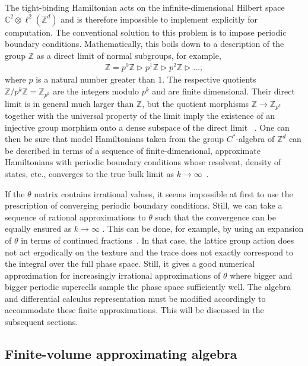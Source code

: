 \documentclass[submission, Phys]{SciPost}
\begin{document}
The tight-binding Hamiltonian acts on the infinite-dimensional Hilbert space $\mathbb{C}^2\otimes \ell^2(\mathbb{Z}^d)$ and is therefore impossible to implement explicitly for computation. 
The conventional solution to this problem is to impose periodic boundary conditions.
Mathematically, this boils down to a description of the group $\mathbb{Z}$ as a direct limit of normal subgroups, for example,
\begin{align}
    \mathbb{Z} = p^0 \mathbb{Z} \triangleright p^1 \mathbb{Z} \triangleright p^2 \mathbb{Z} \triangleright  \ldots,
\end{align}
where $p$ is a natural number greater than $1$.
The respective quotients $\mathbb{Z} / p^k \mathbb{Z} = \mathbb{Z}_{p^k}$ are the integers modulo $p^k$ and are finite dimensional.
Their direct limit is in general much larger than $\mathbb{Z}$, but the quotient morphisms $\mathbb{Z}\to\mathbb{Z}_{p^k}$ together with the universal property of the limit imply the existence of an injective group morphism onto a dense subspace of the direct limit ~\cite[Chap.~4.1]{Lux2023}.
One can then be sure that model Hamiltonians taken from the group $C^\ast$-algebra of $\mathbb{Z}^d$ can be described in terms of a sequence of finite-dimensional, approximate Hamiltonians with periodic boundary conditions whose resolvent, density of states, etc., converges to the true bulk limit as $k\to \infty$~\cite[Chap.~4.3]{Lux2023}.

If the $\theta$ matrix contains irrational values, it seems impossible at first to use the prescription of converging periodic boundary conditions.
Still, we can take a sequence of rational approximations to $\theta$ such that the convergence can be equally ensured as $k\to\infty$ \cite[Ch. 5]{Prodan2017}. 
This can be done, for example, by using an expansion of $\theta$ in terms of continued fractions~\cite{Landi2001}.
In that case, the lattice group action does not act ergodically on the texture and the trace does not exactly correspond to the integral over the full phase space. 
Still, it gives a good numerical approximation for increasingly irrational approximations of $\theta$ where bigger and bigger periodic supercells sample the phase space sufficiently well. 
The algebra and differential calculus representation must be modified accordingly to accommodate these finite approximations. 
This will be discussed in the subsequent sections.


\subsection{Finite-volume approximating algebra}
\label{subsec:periodic_boundary}
\end{document}
